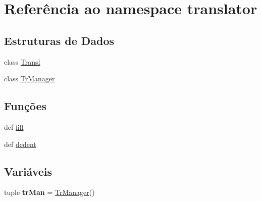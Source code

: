 \hypertarget{namespacetranslator}{\section{Referência ao namespace translator}
\label{namespacetranslator}
}
\subsection*{Estruturas de Dados}
\begin{DoxyCompactItemize}
\item 
class \hyperlink{classtranslator_1_1_transl}{Transl}
\item 
class \hyperlink{classtranslator_1_1_tr_manager}{Tr\-Manager}
\end{DoxyCompactItemize}
\subsection*{Funções}
\begin{DoxyCompactItemize}
\item 
def \hyperlink{namespacetranslator_ab0bbf4a96045d5d4ed933cc6c2f9fc21}{fill}
\item 
def \hyperlink{namespacetranslator_a58ffd9a4dc6a31317d7151c87596ea36}{dedent}
\end{DoxyCompactItemize}
\subsection*{Variáveis}
\begin{DoxyCompactItemize}
\item 
\hypertarget{namespacetranslator_a18ddb4531c263d378193bdcf1d2ac618}{tuple {\bfseries tr\-Man} = \hyperlink{classtranslator_1_1_tr_manager}{Tr\-Manager}()}\label{namespacetranslator_a18ddb4531c263d378193bdcf1d2ac618}

\end{DoxyCompactItemize}


